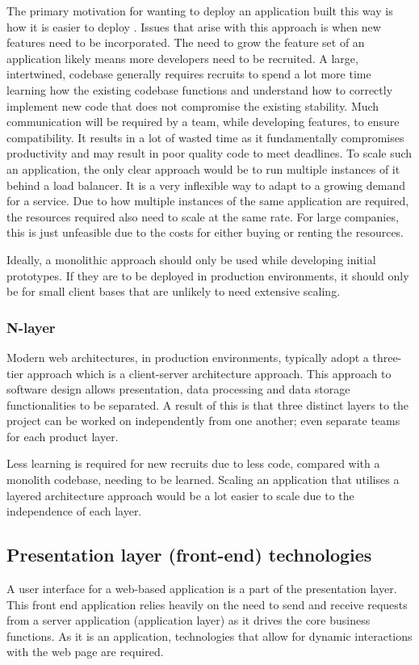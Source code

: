 The primary motivation for wanting to deploy an application built this way is how it is easier to deploy \cite{namiot2014micro}.
Issues that arise with this approach is when new features need to be incorporated. The need to grow the feature set of an application likely means
more developers need to be recruited. A large, intertwined, codebase generally requires recruits to spend a lot more time learning
how the existing codebase functions and understand how to correctly implement new code that does not compromise the existing stability.
Much communication will be required by a team, while developing features, to ensure compatibility.
It results in a lot of wasted time as it fundamentally compromises productivity and may result in poor quality code to meet deadlines.
To scale such an application, the only clear approach would be to run multiple instances of it behind a load balancer.
It is a very inflexible way to adapt to a growing demand for a service.
Due to how multiple instances of the same application are required, the resources required also need to scale at the same rate.
For large companies, this is just unfeasible due to the costs for either buying or renting the resources. 

Ideally, a monolithic approach should only be used while developing initial prototypes. If they are to be deployed in production environments,
it should only be for small client bases that are unlikely to need extensive scaling.

\subsubsection{N-layer} \label{nlayer}

Modern web architectures, in production environments, typically adopt a three-tier approach which is a client-server architecture approach.
This approach to software design allows presentation, data processing and data storage functionalities to be separated.
A result of this is that three distinct layers to the project can be worked on independently from one another; even separate teams for
each product layer. 

Less learning is required for new recruits due to less code, compared with a monolith codebase, needing to be learned.
Scaling an application that utilises a layered architecture approach would be a lot easier to scale due to the independence of each layer.

\subsection{Presentation layer (front-end) technologies}
A user interface for a web-based application is a part of the presentation layer.
This front end application relies heavily on the need to send and receive requests from a server application (application layer) as 
it drives the core business functions.
As it is an application, technologies that allow for dynamic interactions with the web page are required.

